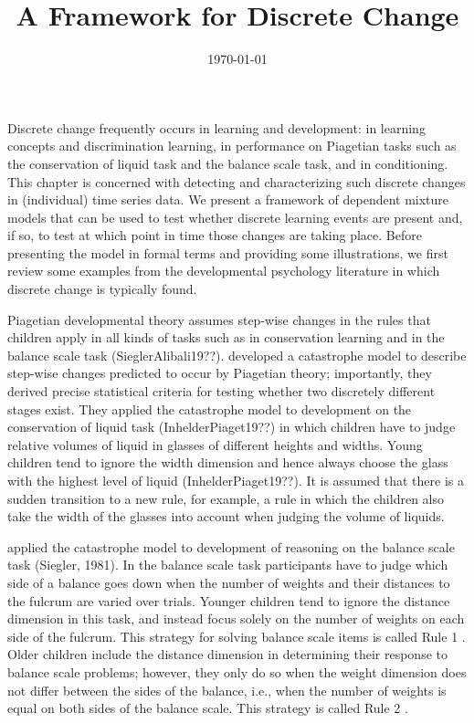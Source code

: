 \documentclass[a4paper,12pt,man,english]{apa} %
\title{A Framework for Discrete Change}
\date{\today}
\newcommand{\citet}{\citeA}
\begin{document}
\maketitle

Discrete change frequently occurs in learning and development: in
learning concepts and discrimination learning, in performance on
Piagetian tasks such as the conservation of liquid task and the
balance scale task, and in conditioning.  This chapter is concerned
with detecting and characterizing such discrete changes in
(individual) time series data.  We present a framework of dependent
mixture models that can be used to test whether discrete learning
events are present and, if so, to test at which point in time those
changes are taking place.  Before presenting the model in formal terms
and providing some illustrations, we first review some examples from
the developmental psychology literature in which discrete change is
typically found.

Piagetian developmental theory assumes step-wise changes in the rules
that children apply in all kinds of tasks such as in conservation
learning and in the balance scale task (SieglerAlibali19??).
\citet{Maas1992} developed a catastrophe model to describe step-wise
changes predicted to occur by Piagetian theory; importantly, they
derived precise statistical criteria for testing whether two
discretely different stages exist.  They applied the catastrophe model
to development on the conservation of liquid task (InhelderPiaget19??)
in which children have to judge relative volumes of liquid in glasses
of different heights and widths.  Young children tend to ignore the
width dimension and hence always choose the glass with the highest
level of liquid (InhelderPiaget19??).  It is assumed that there is a
sudden transition to a new rule, for example, a rule in which the
children also take the width of the glasses into account when judging
the volume of liquids.


\citet{Jansen2001} applied the catastrophe model to
development of reasoning on the balance scale task (Siegler, 1981).
In the balance scale task participants have to judge which side of a
balance goes down when the number of weights and their distances to
the fulcrum are varied over trials.  Younger children tend to ignore
the distance dimension in this task, and instead focus solely on the
number of weights on each side of the fulcrum.  This strategy for
solving balance scale items is called Rule 1 \cite{Siegler1981}.  Older
children include the distance dimension in determining their response
to balance scale problems; however, they only do so when the weight
dimension does not differ between the sides of the balance, i.e., when
the number of weights is equal on both sides of the balance scale.
This strategy is called Rule 2 \cite{Siegler1981}.
\end{document}
